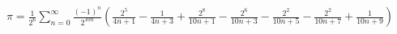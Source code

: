 \documentclass[preview]{standalone}
\begin{document}
\begin{align*}
\pi = \frac{1}{2^6} \sum_{n=0}^{\infty} \frac{(-1)^n}{2^{10n}} \left( \frac{2^5}{4n+1} - \frac{1}{4n+3} + \frac{2^8}{10n+1} - \frac{2^6}{10n+3} - \frac{2^2}{10n+5} - \frac{2^2}{10n+7} + \frac{1}{10n+9} \right)
\end{align*}
\end{document}
